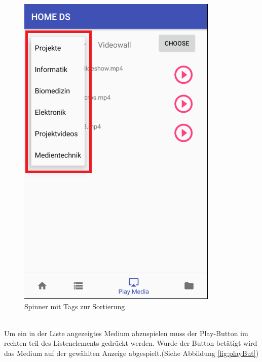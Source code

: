 \begin{figure}[H]
\centering
\includegraphics[scale=0.35]{images/06_AndroidApp/06_TagChoice}
\caption{Spinner mit Tags zur Sortierung}
\label{fig:spinner}
\end{figure}
\\
Um ein in der Liste angezeigtes Medium abzuspielen muss der Play-Button im rechten teil des Listenelements gedrückt werden. Wurde der Button betätigt wird das Medium auf der gewählten Anzeige abgespielt.(Siehe Abbildung \ref{fig:playBut})
